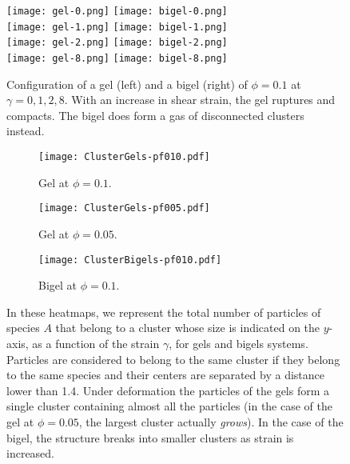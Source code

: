 \begin{figure}
	\centering
	\texttt{[image: gel-0.png]}
	\texttt{[image: bigel-0.png]} \\
	\texttt{[image: gel-1.png]}
	\texttt{[image: bigel-1.png]} \\
	\texttt{[image: gel-2.png]}
	\texttt{[image: bigel-2.png]} \\
	\texttt{[image: gel-8.png]}
	\texttt{[image: bigel-8.png]} \\
	\caption{Configuration of a gel (left) and a bigel (right) of $\phi = 0.1$ at $\gamma = 0, 1, 2, 8$. With an increase in shear strain, the gel ruptures and compacts. The bigel does form a gas of disconnected clusters instead. \label{fig:GelBigelDeformation}}
\end{figure}

\begin{landscape}

\begin{figure}
	\centering
	\begin{subfigure}[b]{0.5\textheight}
		\centering
		\texttt{[image: ClusterGels-pf010.pdf]}
		\caption{Gel at $\phi = 0.1$.}	
	\end{subfigure}
	\begin{subfigure}[b]{0.5\textheight}
		\centering
		\texttt{[image: ClusterGels-pf005.pdf]}
		\caption{Gel at $\phi = 0.05$.}
	\end{subfigure}	
	\begin{subfigure}[b]{0.5\textheight}
		\centering
		\texttt{[image: ClusterBigels-pf010.pdf]}
		\caption{Bigel at $\phi = 0.1$.}
	\end{subfigure}
	\caption{In these heatmaps, we represent the total number of particles of species $A$ that belong to a cluster whose size is indicated on the $y$-axis, as a function of the strain $\gamma$, for gels and bigels systems. Particles are considered to belong to the same cluster if they belong to the same species and their centers are separated by a distance lower than 1.4. Under deformation the particles of the gels form a single cluster containing almost all the particles (in the case of the gel at $\phi = 0.05$, the largest cluster actually \emph{grows}). In the case of the bigel, the structure breaks into smaller clusters as strain is increased. \label{fig:ClustersVsGammaGelBigel}}
\end{figure}

\end{landscape}

